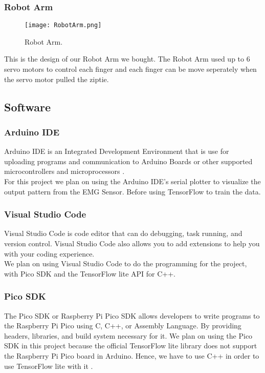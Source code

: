 \documentclass[12pt]{article}
\begin{document}
    \subsubsection{Robot Arm}
    \begin{flushleft}
        \begin{figure}[h!]
            \centering
            \texttt{[image: RobotArm.png]}
            \caption{Robot Arm.}
        \end{figure}
        This is the design of our Robot Arm we bought. The Robot Arm used up to 6 servo motors to control each finger and each finger can be move seperately
        when the servo motor pulled the ziptie.
    \end{flushleft}
    \subsection{Software}
    \subsubsection{Arduino IDE}
    \begin{flushleft}
    Arduino IDE is an Integrated Development Environment that is use for uploading programs 
    and communication to Arduino Boards or other supported microcontrollers and microprocessors
    \cite{arduino}.
    \\
    For this project we plan on using the Arduino IDE's serial plotter to visualize the output pattern
    from the EMG Sensor. Before using TensorFlow to train the data.
    \end{flushleft}
    \subsubsection{Visual Studio Code}
    \begin{flushleft}
    Visual Studio Code is code editor that can do debugging, task running, and version control.
    Visual Studio Code also allows you to add extensions to help you with your coding experience.
    \\
    \hspace*{2em}We plan on using Visual Studio Code to do the programming for the project, with Pico SDK and the
    TensorFlow lite API for C++.
    \end{flushleft}
    \subsubsection{Pico SDK}
    \begin{flushleft}
    The Pico SDK or Raspberry Pi Pico SDK allows developers to write programs to the Raspberry Pi Pico
    using C, C++, or Assembly Language. By providing headers, libraries, and build system necessary for it.
    We plan on using the Pico SDK in this project because the official TensorFlow lite library does not
    support the Raspberry Pi Pico board in Arduino. Hence, we have to use C++ in order to use TensorFlow lite with it
    \cite{raspberrypi}.
    \end{flushleft}
\end{document}
